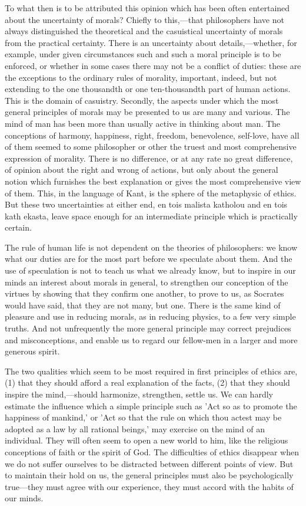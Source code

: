 \documentclass[11pt,letter]{article}
\begin{document}
\par  To what then is to be attributed this opinion which has been often entertained about the uncertainty of morals? Chiefly to this,—that philosophers have not always distinguished the theoretical and the casuistical uncertainty of morals from the practical certainty. There is an uncertainty about details,—whether, for example, under given circumstances such and such a moral principle is to be enforced, or whether in some cases there may not be a conflict of duties: these are the exceptions to the ordinary rules of morality, important, indeed, but not extending to the one thousandth or one ten-thousandth part of human actions. This is the domain of casuistry. Secondly, the aspects under which the most general principles of morals may be presented to us are many and various. The mind of man has been more than usually active in thinking about man. The conceptions of harmony, happiness, right, freedom, benevolence, self-love, have all of them seemed to some philosopher or other the truest and most comprehensive expression of morality. There is no difference, or at any rate no great difference, of opinion about the right and wrong of actions, but only about the general notion which furnishes the best explanation or gives the most comprehensive view of them. This, in the language of Kant, is the sphere of the metaphysic of ethics. But these two uncertainties at either end, en tois malista katholou and en tois kath ekasta, leave space enough for an intermediate principle which is practically certain.

\par  The rule of human life is not dependent on the theories of philosophers: we know what our duties are for the most part before we speculate about them. And the use of speculation is not to teach us what we already know, but to inspire in our minds an interest about morals in general, to strengthen our conception of the virtues by showing that they confirm one another, to prove to us, as Socrates would have said, that they are not many, but one. There is the same kind of pleasure and use in reducing morals, as in reducing physics, to a few very simple truths. And not unfrequently the more general principle may correct prejudices and misconceptions, and enable us to regard our fellow-men in a larger and more generous spirit.

\par  The two qualities which seem to be most required in first principles of ethics are, (1) that they should afford a real explanation of the facts, (2) that they should inspire the mind,—should harmonize, strengthen, settle us. We can hardly estimate the influence which a simple principle such as 'Act so as to promote the happiness of mankind,' or 'Act so that the rule on which thou actest may be adopted as a law by all rational beings,' may exercise on the mind of an individual. They will often seem to open a new world to him, like the religious conceptions of faith or the spirit of God. The difficulties of ethics disappear when we do not suffer ourselves to be distracted between different points of view. But to maintain their hold on us, the general principles must also be psychologically true—they must agree with our experience, they must accord with the habits of our minds.
\end{document}
